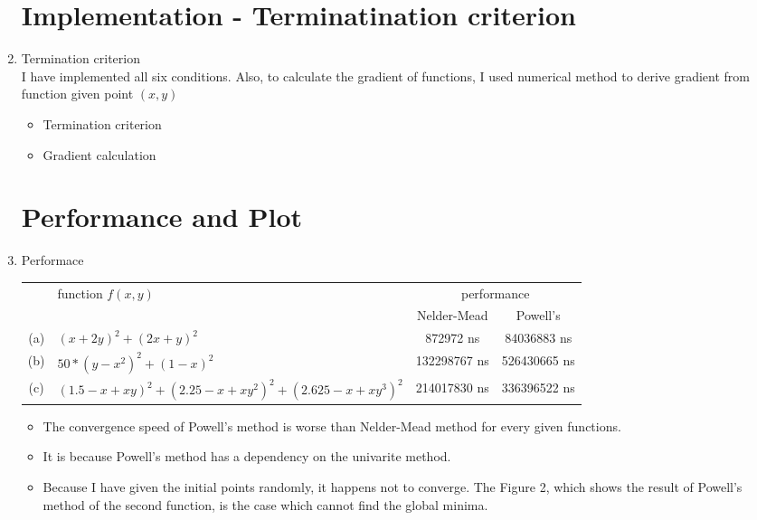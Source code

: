 \documentclass[12pt,letterpaper]{article}
\begin{document}
\begin{enumerate}
\begin{enumerate}
\end{enumerate}

\newpage

\section*{Implementation - Terminatination criterion}
\item Termination criterion
\\ I have implemented all six conditions. 
Also, to calculate the gradient of functions, 
I used numerical method to derive gradient from function given point $(x, y)$
\begin{itemize}
\item Termination criterion
\item Gradient calculation
\end{itemize}

\section*{Performance and Plot}
\item Performace
\begin{center}
    \begin{tabular}{| c | l | c | c |} \hline
                  & \multirow{2}{*}{function $f(x, y)$}               & \multicolumn{2}{c|}{performance} \\ \cline{3-4}
                  &                                                   & Nelder-Mead & Powell's  \\ \hline
        (a) & $(x+2y)^2 + (2x+y)^2$                                   & 872972 ns   & 84036883 ns \\ 
        (b) & $50*(y-x^2)^2 + (1-x)^2$                                & 132298767 ns& 526430665 ns \\ 
        (c) & $(1.5-x+xy)^2 + (2.25-x+xy^2)^2 + (2.625 - x+ xy^3)^2$  & 214017830 ns& 336396522 ns \\
        \hline
    \end{tabular}
\end{center}
\begin{itemize}
  \item The convergence speed of Powell's method is worse than Nelder-Mead method for every given functions.
  \item It is because Powell's method has a dependency on the univarite method.
  \item Because I have given the initial points randomly, it happens not to converge. 
  The Figure 2, which shows the result of Powell's method of the second function, is the case which cannot find the global minima.
\end{itemize}


\end{enumerate}
\end{document}
